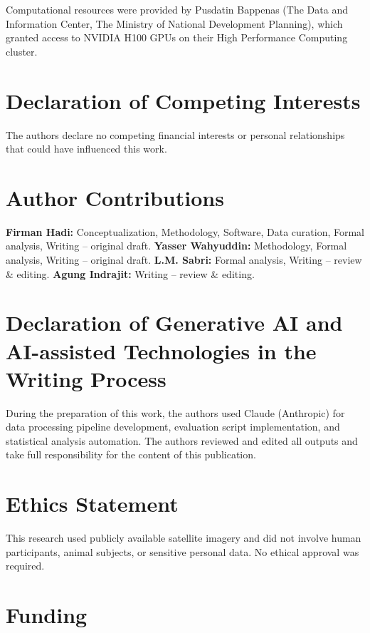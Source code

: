 \documentclass[12pt,a4paper]{article}
\begin{document}
Computational resources were provided by Pusdatin Bappenas (The Data and Information Center, The Ministry of National Development Planning), which granted access to NVIDIA H100 GPUs on their High Performance Computing cluster.



\section*{Declaration of Competing Interests}

The authors declare no competing financial interests or personal relationships that could have influenced this work.



\section*{Author Contributions}

\textbf{Firman Hadi:} Conceptualization, Methodology, Software, Data curation, Formal analysis, Writing -- original draft. \textbf{Yasser Wahyuddin:} Methodology, Formal analysis, Writing -- original draft. \textbf{L.M. Sabri:} Formal analysis, Writing -- review \& editing. \textbf{Agung Indrajit:} Writing -- review \& editing.



\section*{Declaration of Generative AI and AI-assisted Technologies in the Writing Process}

During the preparation of this work, the authors used Claude (Anthropic) for data processing pipeline development, evaluation script implementation, and statistical analysis automation. The authors reviewed and edited all outputs and take full responsibility for the content of this publication.



\section*{Ethics Statement}

This research used publicly available satellite imagery and did not involve human participants, animal subjects, or sensitive personal data. No ethical approval was required.



\section*{Funding}
\end{document}

